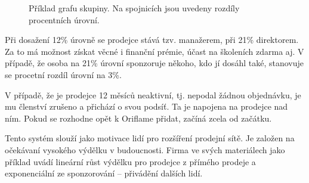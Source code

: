 \documentclass[a4wide,12pt]{report}
\begin{document}
\begin{figure}[h]
\begin{center}
\end{center}
\caption{Příklad grafu skupiny. Na spojnicích jsou uvedeny rozdíly procentních úrovní.}
\label{fig:ggraph}
\end{figure}

Při dosažení 12\% úrovně se prodejce stává tzv. manažerem, při 21\% direktorem. Za to má možnost získat věcné i finanční prémie, účast na školeních zdarma aj. V případě, že osoba na 21\% úrovní sponzoruje někoho, kdo jí dosáhl také, stanovuje se procetní rozdíl úrovní na 3\%.

V případě, že je prodejce 12 měsíců neaktivní, tj. nepodal žádnou objednávku, je mu členství zrušeno a přichází o svou podsíť. Ta je napojena na prodejce nad ním. Pokud se rozhodne opět k Oriflame přidat, začíná zcela od začátku.

Tento systém slouží jako motivace lidí pro rozšíření prodejní sítě. Je založen na očekávaní vysokého výdělku v budoucnosti. Firma ve svých materiálech jako příklad uvádí lineární růst výdělku pro prodejce z přímého prodeje a exponenciální ze sponzorování -- přivádění dalších lidí.
\end{document}
